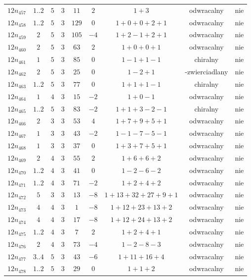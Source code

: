 \begin{longtable}{ccccccccc}
$12n_{457}$ & $1..2$ & $5$ & $3$ & $11$ & $2$ & $1+3$ & odwracalny & nie \\
$12n_{458}$ & $1..2$ & $5$ & $3$ & $129$ & $0$ & $1+0+0+2+1$ & odwracalny & nie \\
$12n_{459}$ & $2$ & $5$ & $3$ & $105$ & $-4$ & $1+2-1+2+1$ & odwracalny & nie \\
$12n_{460}$ & $2$ & $5$ & $3$ & $63$ & $2$ & $1+0+0+1$ & odwracalny & nie \\
$12n_{461}$ & $1$ & $5$ & $3$ & $85$ & $0$ & $1-1+1-1$ & chiralny & nie \\
$12n_{462}$ & $2$ & $5$ & $3$ & $25$ & $0$ & $1-2+1$ & -zwierciadlany & nie \\
$12n_{463}$ & $1..2$ & $5$ & $3$ & $77$ & $0$ & $1+1+1-1$ & chiralny & nie \\
$12n_{464}$ & $1$ & $4$ & $3$ & $15$ & $-2$ & $1+0-1$ & odwracalny & nie \\
$12n_{465}$ & $1..2$ & $5$ & $3$ & $83$ & $-2$ & $1+1+3-2-1$ & chiralny & nie \\
$12n_{466}$ & $2$ & $3$ & $3$ & $53$ & $4$ & $1+7+9+5+1$ & odwracalny & nie \\
$12n_{467}$ & $1$ & $3$ & $3$ & $43$ & $-2$ & $1-1-7-5-1$ & odwracalny & nie \\
$12n_{468}$ & $1$ & $3$ & $3$ & $37$ & $0$ & $1+3+7+5+1$ & odwracalny & nie \\
$12n_{469}$ & $2$ & $4$ & $3$ & $55$ & $2$ & $1+6+6+2$ & odwracalny & nie \\
$12n_{470}$ & $1..2$ & $4$ & $3$ & $41$ & $0$ & $1-2-6-2$ & odwracalny & nie \\
$12n_{471}$ & $1..2$ & $4$ & $3$ & $71$ & $-2$ & $1+2+4+2$ & odwracalny & nie \\
$12n_{472}$ & $5$ & $3$ & $3$ & $13$ & $-8$ & $1+13+32+27+9+1$ & odwracalny & nie \\
$12n_{473}$ & $4$ & $4$ & $3$ & $1$ & $-8$ & $1+12+23+13+2$ & odwracalny & nie \\
$12n_{474}$ & $4$ & $4$ & $3$ & $17$ & $-8$ & $1+12+24+13+2$ & odwracalny & nie \\
$12n_{475}$ & $1..2$ & $4$ & $3$ & $7$ & $2$ & $1+2+4+1$ & odwracalny & nie \\
$12n_{476}$ & $2$ & $4$ & $3$ & $73$ & $-4$ & $1-2-8-3$ & odwracalny & nie \\
$12n_{477}$ & $3..4$ & $5$ & $3$ & $43$ & $-6$ & $1+11+16+4$ & odwracalny & nie \\
$12n_{478}$ & $1..2$ & $5$ & $3$ & $29$ & $0$ & $1+1+2$ & odwracalny & nie \\

\end{longtable}
